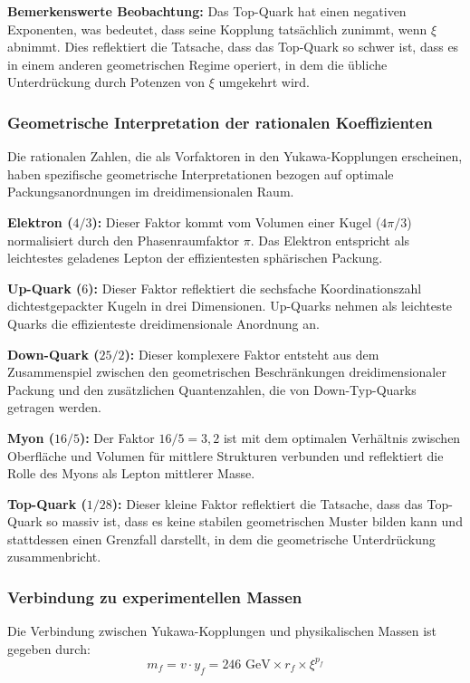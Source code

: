 \documentclass[12pt,a4paper]{article}
\newcommand{\xipar}{\xi}
\begin{document}
	\textbf{Bemerkenswerte Beobachtung:} Das Top-Quark hat einen negativen Exponenten, was bedeutet, dass seine Kopplung tatsächlich zunimmt, wenn $\xipar$ abnimmt. Dies reflektiert die Tatsache, dass das Top-Quark so schwer ist, dass es in einem anderen geometrischen Regime operiert, in dem die übliche Unterdrückung durch Potenzen von $\xipar$ umgekehrt wird.
	
	\subsubsection{Geometrische Interpretation der rationalen Koeffizienten}
	
	Die rationalen Zahlen, die als Vorfaktoren in den Yukawa-Kopplungen erscheinen, haben spezifische geometrische Interpretationen bezogen auf optimale Packungsanordnungen im dreidimensionalen Raum.
	
	\textbf{Elektron ($4/3$):} Dieser Faktor kommt vom Volumen einer Kugel ($4\pi/3$) normalisiert durch den Phasenraumfaktor $\pi$. Das Elektron entspricht als leichtestes geladenes Lepton der effizientesten sphärischen Packung.
	
	\textbf{Up-Quark ($6$):} Dieser Faktor reflektiert die sechsfache Koordinationszahl dichtestgepackter Kugeln in drei Dimensionen. Up-Quarks nehmen als leichteste Quarks die effizienteste dreidimensionale Anordnung an.
	
	\textbf{Down-Quark ($25/2$):} Dieser komplexere Faktor entsteht aus dem Zusammenspiel zwischen den geometrischen Beschränkungen dreidimensionaler Packung und den zusätzlichen Quantenzahlen, die von Down-Typ-Quarks getragen werden.
	
	\textbf{Myon ($16/5$):} Der Faktor $16/5 = 3{,}2$ ist mit dem optimalen Verhältnis zwischen Oberfläche und Volumen für mittlere Strukturen verbunden und reflektiert die Rolle des Myons als Lepton mittlerer Masse.
	
	\textbf{Top-Quark ($1/28$):} Dieser kleine Faktor reflektiert die Tatsache, dass das Top-Quark so massiv ist, dass es keine stabilen geometrischen Muster bilden kann und stattdessen einen Grenzfall darstellt, in dem die geometrische Unterdrückung zusammenbricht.
	
	\subsubsection{Verbindung zu experimentellen Massen}
	
	Die Verbindung zwischen Yukawa-Kopplungen und physikalischen Massen ist gegeben durch:
	\begin{equation}
		m_f = v \cdot y_f = 246 \text{ GeV} \times r_f \times \xipar^{p_f}
	\end{equation}
	
\end{document}
